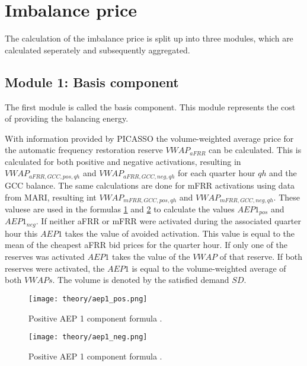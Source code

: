 \documentclass[class=scrbook, crop=false]{standalone}
\begin{document}
\section{Imbalance price}
\label{Section::Imbalance_Price}
The calculation of the imbalance price is split up into three modules, which are calculated seperately and subsequently aggregated.

\subsection{Module 1: Basis component}
The first module is called the basis component. 
This module represents the cost of providing the balancing energy.

With information provided by PICASSO the volume-weighted average price for the automatic frequency restoration reserve $VWAP_{aFRR}$ can be calculated. This is calculated for both positive and negative activations, resulting in $VWAP_{aFRR, GCC, pos, qh}$ and $VWAP_{aFRR,  GCC, neg, qh}$ for each quarter hour $qh$ and the GCC balance.
The same calculations are done for mFRR activations using data from MARI, resulting int $VWAP_{mFRR, GCC, pos, qh}$ and $VWAP_{mFRR, GCC, neg, qh}$. 
These valuese are used in the formulas \ref{fig::aep1_pos} and \ref{fig::aep1_neg} to calculate the values $AEP1_{pos}$ and $AEP1_{neg}$. 
If neither aFRR or mFRR were activated during the associated quarter hour this $AEP1$ takes the value of avoided activation. This value is equal to the mean of the cheapest aFRR bid prices for the quarter hour.
If only one of the reserves was activated $AEP1$ takes the value of the $VWAP$ of that reserve. 
If both reserves were activated, the $AEP1$ is equal to the volume-weighted average of both $VWAPs$. The volume is denoted by the satisfied demand $SD$.

\begin{figure}[ht]
            \centering
            \texttt{[image: theory/aep1\_pos.png]}
            \caption[Positive AEP 1 component formula]{Positive AEP 1 component formula \cite{NetztransparenzReBAP}.}
            \label{fig::aep1_pos}
 \end{figure}
 
 

 \begin{figure}[ht]
            \centering
            \texttt{[image: theory/aep1\_neg.png]}
             \caption[Positive AEP 1 component formula]{Positive AEP 1 component formula \cite{NetztransparenzReBAP}.}
            \label{fig::aep1_neg}
 \end{figure}
\end{document}
